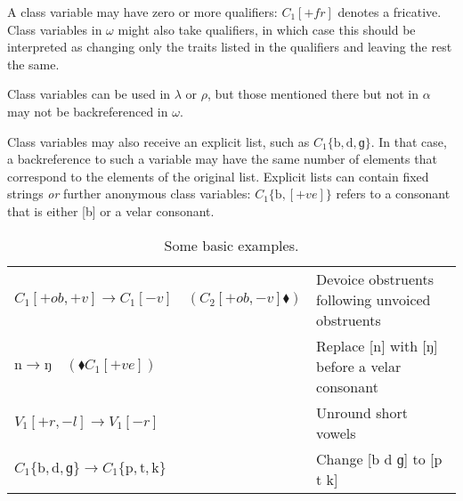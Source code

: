 \documentclass{book}
\begin{document}
A class variable may have zero or more qualifiers: $C_1[+fr]$ denotes a fricative. Class variables in $\omega$ might also take qualifiers, in which case this should be interpreted as changing only the traits listed in the qualifiers and leaving the rest the same.

Class variables can be used in $\lambda$ or $\rho$, but those mentioned there but not in $\alpha$ may not be backreferenced in $\omega$.

Class variables may also receive an explicit list, such as $C_1\{\text{b}, \text{d}, \text{ɡ}\}$. In that case, a backreference to such a variable may have the same number of elements that correspond to the elements of the original list. Explicit lists can contain fixed strings \emph{or} further anonymous class variables: $C_1\{\text{b}, [+ve]\}$ refers to a consonant that is either [b] or a velar consonant.

\begin{table}[h]
  \caption{Some basic examples.}
  \centering
  \begin{tabu} to \linewidth {|l|X|}
    \hline
    $C_1[+ob,+v] \rightarrow C_1[-v] \quad(C_2[+ob,-v] \blacklozenge)$ & Devoice obstruents following unvoiced obstruents \\
    $\text{n} \rightarrow \text{ŋ} \quad(\blacklozenge C_1[+ve])$ & Replace [n] with [ŋ] before a velar consonant \\
    $V_1[+r,-l] \rightarrow V_1[-r]$ & Unround short vowels \\
    $C_1\{\text{b}, \text{d}, \text{ɡ}\} \rightarrow C_1\{\text{p}, \text{t}, \text{k}\}$ & Change [b d ɡ] to [p t k] \\
    \hline
  \end{tabu}
\end{table}
\end{document}
